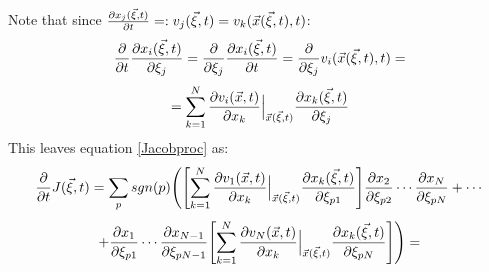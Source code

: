 \documentclass[11pt, a4paper]{article} %
\DeclareRobustCommand{\mybox}[2][gray!20]{%
\begin{tcolorbox}[   %
        left=1cm,
        right=1cm,
        top=0.5cm,
        bottom=0.5cm,
        colback=#1,
        colframe=#1,
        width=\dimexpr\textwidth\relax, 
        enlarge left by=0mm,
        boxsep=5pt,
        arc=0pt,outer arc=0pt,
        ]
        #2
\end{tcolorbox}
}
\begin{document}
\mybox{
Note that since $\pdv{x_j(\vec{\xi},t)}{t}=:v_j(\vec{\xi},t)=v_k(\vec{x}(\vec{\xi},t),t)$:
\begin{equation}
\pdv{}{t}\pdv{x_i(\vec{\xi},t)}{\xi_j}=\pdv{}{\xi_j}\pdv{x_i(\vec{\xi},t)}{t}=\pdv{}{\xi_j}v_i(\vec{x}(\vec{\xi},t),t)=
\end{equation}
$$
=\sum_{k=1}^N \pdv{v_i(\vec{x},t)}{x_k}\Big\rvert_{\vec{x}(\vec{\xi},t)}\pdv{x_k(\vec{\xi},t)}{\xi_j}
$$
This leaves equation \eqref{Jacobproc} as:
\begin{equation}
\pdv{}{t}J(\vec{\xi},t)=\sum_p sgn(p) \Bigg(\qty[\sum_{k=1}^N \pdv{v_1(\vec{x},t)}{x_k}\Big\rvert_{\vec{x}(\vec{\xi},t)}\pdv{x_k(\vec{\xi},t)}{\xi_{p1}}]\pdv{x_2}{\xi_{p2}} \cdots \pdv{x_N}{\xi_{pN}}+\cdots
\end{equation}
$$
+\pdv{x_1}{\xi_{p1}} \cdots \pdv{x_{N-1}}{\xi_{pN-1}}\qty[\sum_{k=1}^N \pdv{v_N(\vec{x},t)}{x_k}\Big\rvert_{\vec{x}(\vec{\xi},t)}\pdv{x_k(\vec{\xi},t)}{\xi_{pN}}]\Bigg)=
$$

}
\end{document}
